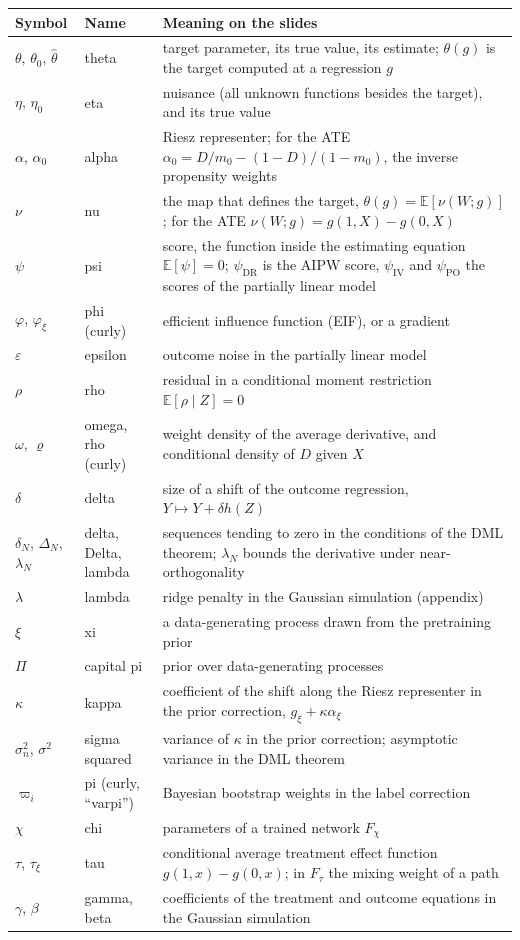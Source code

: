 \documentclass[11pt]{article}
\newcommand{\E}{\mathbb{E}}
\begin{document}
\begin{longtable}{@{}l l p{10.2cm}@{}}
\toprule
Symbol & Name & Meaning on the slides\\
\midrule
\endhead
$\theta$, $\theta_0$, $\hat\theta$ & theta & target parameter, its true value, its estimate; $\theta(g)$ is the target computed at a regression $g$\\
$\eta$, $\eta_0$ & eta & nuisance (all unknown functions besides the target), and its true value\\
$\alpha$, $\alpha_0$ & alpha & Riesz representer; for the ATE $\alpha_0=D/m_0-(1-D)/(1-m_0)$, the inverse propensity weights\\
$\nu$ & nu & the map that defines the target, $\theta(g)=\E[\nu(W;g)]$; for the ATE $\nu(W;g)=g(1,X)-g(0,X)$\\
$\psi$ & psi & score, the function inside the estimating equation $\E[\psi]=0$; $\psi_{\mathrm{DR}}$ is the AIPW score, $\psi_{\mathrm{IV}}$ and $\psi_{\mathrm{PO}}$ the scores of the partially linear model\\
$\varphi$, $\varphi_\xi$ & phi (curly) & efficient influence function (EIF), or a gradient\\
$\varepsilon$ & epsilon & outcome noise in the partially linear model\\
$\rho$ & rho & residual in a conditional moment restriction $\E[\rho\mid Z]=0$\\
$\omega$, $\varrho$ & omega, rho (curly) & weight density of the average derivative, and conditional density of $D$ given $X$\\
$\delta$ & delta & size of a shift of the outcome regression, $Y\mapsto Y+\delta h(Z)$\\
$\delta_N$, $\Delta_N$, $\lambda_N$ & delta, Delta, lambda & sequences tending to zero in the conditions of the DML theorem; $\lambda_N$ bounds the derivative under near-orthogonality\\
$\lambda$ & lambda & ridge penalty in the Gaussian simulation (appendix)\\
$\xi$ & xi & a data-generating process drawn from the pretraining prior\\
$\Pi$ & capital pi & prior over data-generating processes\\
$\kappa$ & kappa & coefficient of the shift along the Riesz representer in the prior correction, $g_\xi+\kappa\alpha_\xi$\\
$\sigma_n^2$, $\sigma^2$ & sigma squared & variance of $\kappa$ in the prior correction; asymptotic variance in the DML theorem\\
$\varpi_i$ & pi (curly, ``varpi'') & Bayesian bootstrap weights in the label correction\\
$\chi$ & chi & parameters of a trained network $F_\chi$\\
$\tau$, $\tau_\xi$ & tau & conditional average treatment effect function $g(1,x)-g(0,x)$; in $F_\tau$ the mixing weight of a path\\
$\gamma$, $\beta$ & gamma, beta & coefficients of the treatment and outcome equations in the Gaussian simulation\\
\bottomrule
\end{longtable}
\end{document}
